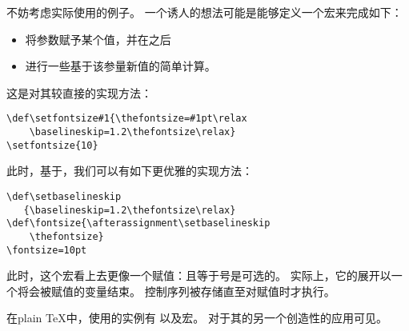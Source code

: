 \documentclass{book}
\begin{document}
不妨考虑实际使用的例子。
一个诱人的想法可能是能够定义一个宏来完成如下：
\begin{itemize} \item 将参数赋予某个值，并在之后
\item 进行一些基于该参量新值的简单计算。
\end{itemize}
这是对其较直接的实现方法：
\begin{verbatim}
\def\setfontsize#1{\thefontsize=#1pt\relax
    \baselineskip=1.2\thefontsize\relax}
\setfontsize{10}
\end{verbatim}
此时，基于，我们可以有如下更优雅的实现方法：
\begin{verbatim}
\def\setbaselineskip
   {\baselineskip=1.2\thefontsize\relax}
\def\fontsize{\afterassignment\setbaselineskip
    \thefontsize}
\fontsize=10pt
\end{verbatim}
此时，这个宏看上去更像一个赋值：且等于号是可选的。
实际上，它的展开以一个将会被赋值的变量结束。
控制序列被存储直至对赋值时才执行。

在plain {\TeX}中，使用的实例有
以及宏。
对于其的另一个创造性的应用可见\cite{Maus}。
\end{document}
